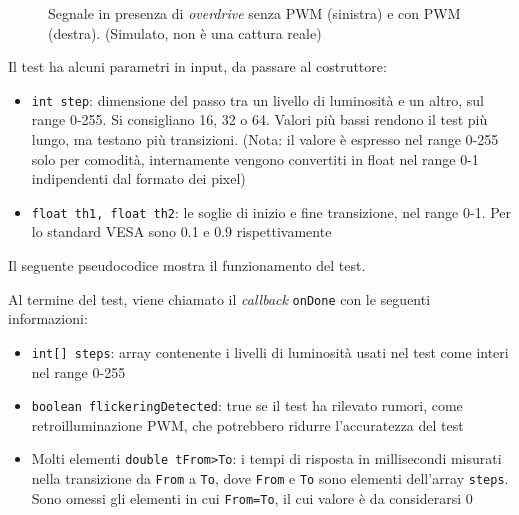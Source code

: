 \begin{figure}[H]
	\centering
	\caption{Segnale in presenza di \textit{overdrive} senza PWM (sinistra) e con PWM (destra). (Simulato, non è una cattura reale)}
	\label{fig:pixelResponseTime_example2}
\end{figure}

Il test ha alcuni parametri in input, da passare al costruttore:\begin{itemize}
	\item \texttt{int step}: dimensione del passo tra un livello di luminosità e un altro, sul range 0-255. Si consigliano 16, 32 o 64. Valori più bassi rendono il test più lungo, ma testano più transizioni. (Nota: il valore è espresso nel range 0-255 solo per comodità, internamente vengono convertiti in float nel range 0-1 indipendenti dal formato dei pixel)
	\item \texttt{float th1, float th2}: le soglie di inizio e fine transizione, nel range 0-1. Per lo standard VESA sono 0.1 e 0.9 rispettivamente
\end{itemize}

Il seguente pseudocodice mostra il funzionamento del test.


Al termine del test, viene chiamato il \textit{callback} \texttt{onDone} con le seguenti informazioni:\begin{itemize}
	\item \texttt{int[] steps}: array contenente i livelli di luminosità usati nel test come interi nel range 0-255
	\item \texttt{boolean flickeringDetected}: true se il test ha rilevato rumori, come retroilluminazione PWM, che potrebbero ridurre l'accuratezza del test
	\item Molti elementi \texttt{double tFrom>To}: i tempi di risposta in millisecondi misurati nella transizione da \texttt{From} a \texttt{To}, dove \texttt{From} e \texttt{To} sono elementi dell'array \texttt{steps}. Sono omessi gli elementi in cui \texttt{From=To}, il cui valore è da considerarsi 0
\end{itemize}

